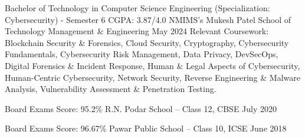 \begin{cventries}
	
	\cventry
	{Bachelor of Technology in Computer Science Engineering (Specialization: Cybersecurity) - Semester 6 CGPA: 3.87/4.0} %
        {NMIMS's Mukesh Patel School of Technology Management \& Engineering}
	{May 2024} %
        {} %
	{Relevant Coursework: Blockchain Security \& Forensics, Cloud Security, Cryptography, Cybersecurity Fundamentals, Cybersecurity Risk Management, Data Privacy, DevSecOps, Digital Forensics \& Incident Response, Human \& Legal Aspects of Cybersecurity, Human-Centric Cybersecurity, Network Security, Reverse Engineering \& Malware Analysis, Vulnerability Assessment \& Penetration Testing.\newline} %
	\vspace{-3.5mm} 
	
	
 \cventry
	{Board Exams Score: 95.2\%} %
	{R.N. Podar School – Class 12, CBSE} %
	{July 2020} %
     {} %
	{
	}%
	\vspace{-3.5mm} 
	
	\cventry
	{Board Exams Score: 96.67\%} %
	{Pawar Public School – Class 10, ICSE} %
	{June 2018} %
     {} %
	{
	}%
	\vspace{-3.5mm} 
\end{cventries}
